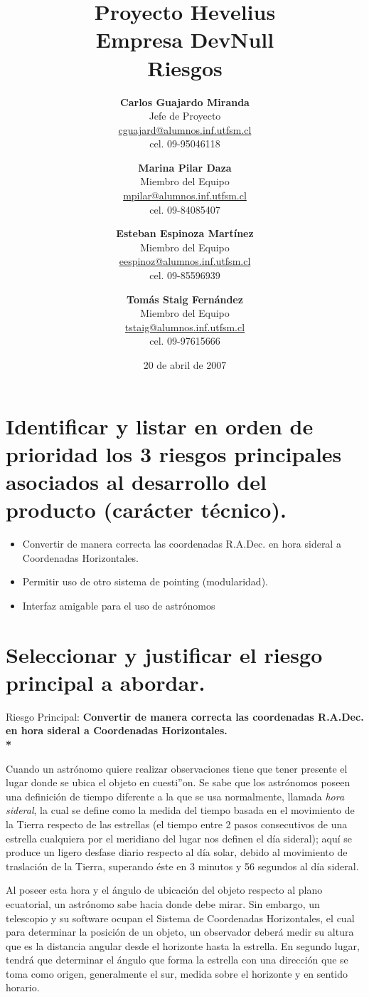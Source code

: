\documentclass[letterpaper,spanish,10pt]{article}
\title{{\Huge \bf Proyecto Hevelius} \\ {\Large Empresa DevNull} \\ {\small Riesgos}}
\author{
{\bf Carlos Guajardo Miranda} \\ Jefe de Proyecto \\ \url{cguajard@alumnos.inf.utfsm.cl} \\ cel. 09-95046118 
\and
{\bf Marina Pilar Daza} \\ Miembro del Equipo \\ \url{mpilar@alumnos.inf.utfsm.cl} \\ cel. 09-84085407
\and
{\bf Esteban Espinoza Mart\'inez} \\ Miembro del Equipo \\ \url{eespinoz@alumnos.inf.utfsm.cl} \\ cel. 09-85596939
\and
{\bf Tom\'as Staig Fern\'andez} \\ Miembro del Equipo \\ \url{tstaig@alumnos.inf.utfsm.cl} \\ cel. 09-97615666
}
\date{20 de abril de 2007}
\begin{document}
\maketitle


%
%
\newpage

\section{Identificar y listar en orden de prioridad los 3 riesgos principales asociados al desarrollo del producto (carácter técnico).}

\begin{itemize}
	\item Convertir de manera correcta las coordenadas R.A.Dec. en hora sideral a Coordenadas Horizontales.
	\item Permitir uso de otro sistema de pointing (modularidad).
	\item Interfaz amigable para el uso de astr\'onomos
\end{itemize}


\section{Seleccionar y justificar el riesgo principal a abordar.}

Riesgo Principal: \bf{Convertir de manera correcta las coordenadas R.A.Dec. en hora sideral a Coordenadas Horizontales.}\\*

Cuando un astr\'onomo quiere realizar observaciones tiene que tener presente el lugar donde se ubica el objeto en cuesti''on.
Se sabe que los astr\'onomos poseen una definici\'on de tiempo diferente a la que se usa normalmente, llamada \textit{hora sideral},
la cual se define como la medida del tiempo basada en el movimiento de la Tierra respecto de las estrellas (el tiempo entre 2 
pasos consecutivos de una estrella cualquiera por el meridiano del lugar nos definen el d\'ia sideral); aqu\'i se produce un 
ligero desfase diario respecto al d\'ia solar, debido al movimiento de traslaci\'on de la Tierra, superando \'este en 3 minutos 
y 56 segundos al d\'ia sideral.

Al poseer esta hora y el ángulo de ubicaci\'on del objeto respecto al plano ecuatorial, un astr\'onomo sabe hacia donde debe mirar. 
Sin embargo, un telescopio y su software ocupan el Sistema de Coordenadas Horizontales, el cual para determinar la posici\'on de 
un objeto, un observador deber\'a medir su altura que es la distancia angular desde el horizonte hasta la estrella. En segundo lugar, 
tendrá que determinar el \'angulo que forma la estrella con una direcci\'on que se toma como origen, generalmente el sur, medida 
sobre el horizonte y en sentido horario.
\end{document}

